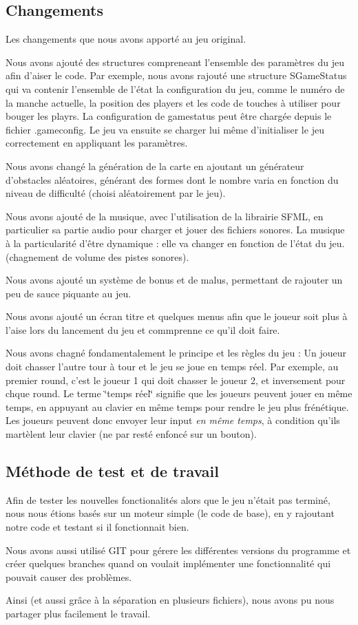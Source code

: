 \subsection*{Changements }

Les changements que nous avons apporté au jeu original.

Nous avons ajouté des structures compreneant l'ensemble des paramètres du jeu afin d'aiser le code. Par exemple, nous avons rajouté une structure S\-Game\-Status qui va contenir l'ensemble de l'état la configuration du jeu, comme le numéro de la manche actuelle, la position des players et les code de touches à utiliser pour bouger les playrs. La configuration de gamestatus peut être chargée depuis le fichier .gameconfig. Le jeu va ensuite se charger lui même d'initialiser le jeu correctement en appliquant les paramètres.

Nous avons changé la génération de la carte en ajoutant un générateur d'obstacles aléatoires, générant des formes dont le nombre varia en fonction du niveau de difficulté (choisi aléatoirement par le jeu).

Nous avons ajouté de la musique, avec l'utilisation de la librairie S\-F\-M\-L, en particulier sa partie audio pour charger et jouer des fichiers sonores. La musique à la particularité d'être dynamique \-: elle va changer en fonction de l'état du jeu. (chagnement de volume des pistes sonores).

Nous avons ajouté un système de bonus et de malus, permettant de rajouter un peu de sauce piquante au jeu.

Nous avons ajouté un écran titre et quelques menus afin que le joueur soit plus à l'aise lors du lancement du jeu et commprenne ce qu'il doit faire.

Nous avons chagné fondamentalement le principe et les règles du jeu \-: Un joueur doit chasser l'autre tour à tour et le jeu se joue en temps réel. Par exemple, au premier round, c'est le joueur 1 qui doit chasser le joueur 2, et inversement pour chque round. Le terme \char`\"{}temps réel\char`\"{} signifie que les joueurs peuvent jouer en même temps, en appuyant au clavier en même temps pour rendre le jeu plus frénétique. Les joueurs peuvent donc envoyer leur input {\itshape en même temps}, à condition qu'ils martèlent leur clavier (ne par resté enfoncé sur un bouton).

\subsection*{Méthode de test et de travail }

Afin de tester les nouvelles fonctionalités alors que le jeu n'était pas terminé, nous nous étions basés sur un moteur simple (le code de base), en y rajoutant notre code et testant si il fonctionnait bien.

Nous avons aussi utilisé G\-I\-T pour gérere les différentes versions du programme et créer quelques branches quand on voulait implémenter une fonctionnalité qui pouvait causer des problèmes.

Ainsi (et aussi grâce à la séparation en plusieurs fichiers), nous avons pu nous partager plus facilement le travail. 